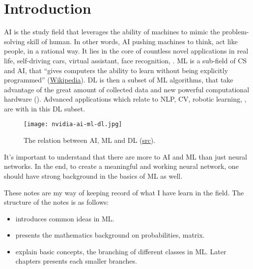 \chapter{Introduction}

\ac{AI} is the study field that leverages the ability of machines to mimic the problem-solving skill of human. In other words, \ac{AI} pushing machines to think, act like people, in a rational way. It lies in the core of countless novel applications in real life, self-driving cars, virtual assistant, face recognition, \etc. \ac{ML} is a sub-field of \ac{CS} and \ac{AI}, that “gives computers the ability to learn without being explicitly programmed” (\href{https://en.wikipedia.org/wiki/Machine_learning}{Wikipedia}). \ac{DL} is then a subset of \ac{ML} algorithms, that take advantage of the great amount of collected data and new powerful computational hardware (). Advanced applications which relate to \ac{NLP}, \ac{CV}, robotic learning, \etc, are with in this \ac{DL} subset.
\begin{figure}[hbt!]
	\centering
	\texttt{[image: nvidia-ai-ml-dl.jpg]}
	\caption{The relation between \ac{AI}, \ac{ML} and \ac{DL} (\href{https://developer.nvidia.com/deep-learning}{src}).}
	\label{fig:relation-ai-ml-dl}
\end{figure}

It's important to understand that there are more to \ac{AI} and \ac{ML} than just neural networks. In the end, to create a meaningful and working neural network, one should have strong background in the basics of \ac{ML} as well.

These notes are my way of keeping record of what I have learn in the field. The structure of the notes is as follows:
\begin{itemize}
	\item {} introduces common ideas in \ac{ML}.
	\item {} presents the mathematics background on probabilities, matrix.
	\item {} explain basic concepts, the branching of different classes in \ac{ML}. Later chapters presents each smaller branches.
\end{itemize}

